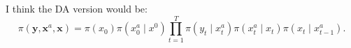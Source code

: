 \documentclass[a4paper]{article}
\newcommand{\bx}{\bm{x}}
\newcommand{\by}{\bm{y}}
\begin{document}
I think the DA version would be:
\begin{equation}
    \pi\left(\by, \bx^a, \bx\right) = \pi\left(x_0\right)\pi\left(x_0^a \mid x^0\right)\prod_{t=1}^T \pi\left(y_t \mid x_t^a\right)\pi\left(x_t^a \mid x_t\right)\pi\left(x_t \mid x^a_{t - 1}\right).
\end{equation}


\end{document}
